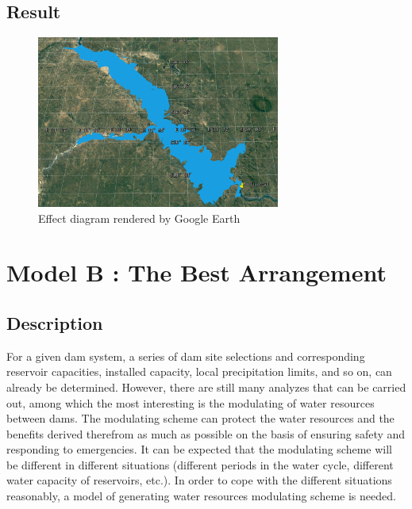\documentclass{mcmthesis}
\begin{document}
\subsection{Result}

\begin{figure}[h]
\small
\centering
\includegraphics[width=8cm]{./figures/reservoir.png}
\caption{Effect diagram rendered by Google Earth} \label{fig:Fig1}
\end{figure}








\section{Model B : The Best Arrangement}
\subsection{Description}
\indent For a given dam system, a series of dam site selections and corresponding reservoir capacities, installed capacity, local precipitation limits, and so on, can already be determined. However, there are still many analyzes that can be carried out, among which the most interesting is the modulating of water resources between dams. The modulating scheme can protect the water resources and the benefits derived therefrom as much as possible on the basis of ensuring safety and responding to emergencies. It can be expected that the modulating scheme will be different in different situations (different periods in the water cycle, different water capacity of reservoirs, etc.). In order to cope with the different situations reasonably, a model of generating water resources modulating scheme is needed.\\
\end{document}
